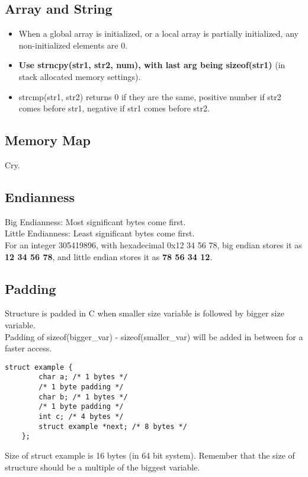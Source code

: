 \documentclass{article}
\begin{document}
\subsection{Array and String}
\begin{itemize}
    \item When a global array is initialized, or a local array is partially initialized, any non-initialized elements are 0.
    \item \textbf{Use strncpy(str1, str2, num), with last arg being sizeof(str1)} (in stack allocated memory settings).
    \item strcmp(str1, str2) returns 0 if they are the same, positive number if str2 comes before str1, negative if str1 comes before str2.
\end{itemize}

\subsection{Memory Map}
Cry.

\subsection{Endianness}
Big Endianness: Most significant bytes come first.\\ 
Little Endianness: Least significant bytes come first.\\
For an integer 305419896, with hexadecimal 0x12 34 56 78, big endian stores it as \textbf{12 34 56 78}, and little endian stores it as \textbf{78 56 34 12}.

\subsection{Padding}
Structure is padded in C when smaller size variable is followed by bigger size variable.\\
Padding of sizeof(bigger\_var) - sizeof(smaller\_var) will be added in between for a faster access.
\begin{lstlisting}[style=CStyle]
    struct example {
        char a; /* 1 bytes */
        /* 1 byte padding */
        char b; /* 1 bytes */
        /* 1 byte padding */
        int c; /* 4 bytes */
        struct example *next; /* 8 bytes */
    };
\end{lstlisting}
Size of struct example is 16 bytes (in 64 bit system). Remember that the size of structure should be a multiple of the biggest variable.
\end{document}
